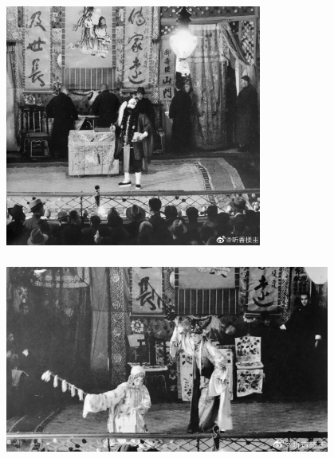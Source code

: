 \documentclass[cjk,slidestop,compress,mathserif,blue]{beamer}
\begin{document}
\frame
{
	\frametitle{}
\begin{figure}[h!]
\centering
\vspace{-0.15in}
\includegraphics[height=0.70\textwidth,width=0.75\textwidth, clip]{Figures_Peking-Opera/PekOpe_His-1.jpg}
\label{History-1}
\end{figure}
}

\frame
{
	\frametitle{}
\begin{figure}[h!]
\centering
\vspace{-0.10in}
\includegraphics[height=0.60\textwidth,width=0.95\textwidth, clip]{Figures_Peking-Opera/PekOpe_His-2.jpg}
\label{History-2}
\end{figure}
}
\end{document}
